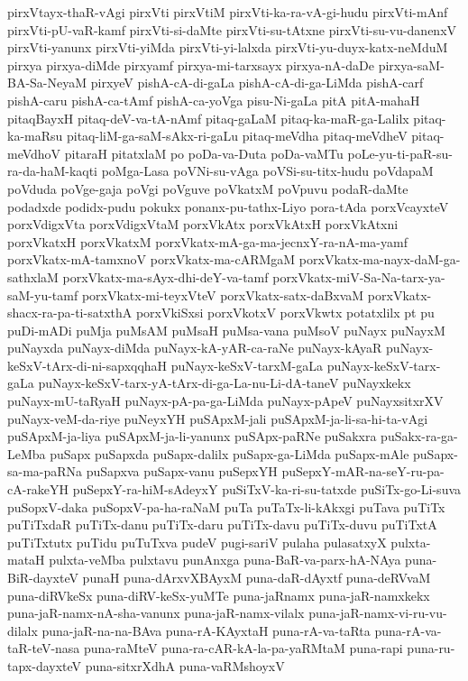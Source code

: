 {pirxVtayx-thaR-vAgi
pirxVti
pirxVtiM
pirxVti-ka-ra-vA-gi-hudu
pirxVti-mAnf
pirxVti-pU-vaR-kamf
pirxVti-si-daMte
pirxVti-su-tAtxne
pirxVti-su-vu-danenxV
pirxVti-yanunx
pirxVti-yiMda
pirxVti-yi-lalxda
pirxVti-yu-duyx-katx-neMduM
pirxya
pirxya-diMde
pirxyamf
pirxya-mi-tarxsayx
pirxya-nA-daDe
pirxya-saM-BA-Sa-NeyaM
pirxyeV
pishA-cA-di-gaLa
pishA-cA-di-ga-LiMda
pishA-carf
pishA-caru
pishA-ca-tAmf
pishA-ca-yoVga
pisu-Ni-gaLa
pitA
pitA-mahaH
pitaqBayxH
pitaq-deV-va-tA-nAmf
pitaq-gaLaM
pitaq-ka-maR-ga-Lalilx
pitaq-ka-maRsu
pitaq-liM-ga-saM-sAkx-ri-gaLu
pitaq-meVdha
pitaq-meVdheV
pitaq-meVdhoV
pitaraH
pitatxlaM
po
poDa-va-Duta
poDa-vaMTu
poLe-yu-ti-paR-su-ra-da-haM-kaqti
poMga-Lasa
poVNi-su-vAga
poVSi-su-titx-hudu
poVdapaM
poVduda
poVge-gaja
poVgi
poVguve
poVkatxM
poVpuvu
podaR-daMte
podadxde
podidx-pudu
pokukx
ponanx-pu-tathx-Liyo
pora-tAda
porxVcayxteV
porxVdigxVta
porxVdigxVtaM
porxVkAtx
porxVkAtxH
porxVkAtxni
porxVkatxH
porxVkatxM
porxVkatx-mA-ga-ma-jecnxY-ra-nA-ma-yamf
porxVkatx-mA-tamxnoV
porxVkatx-ma-cARMgaM
porxVkatx-ma-nayx-daM-ga-sathxlaM
porxVkatx-ma-sAyx-dhi-deY-va-tamf
porxVkatx-miV-Sa-Na-tarx-ya-saM-yu-tamf
porxVkatx-mi-teyxVteV
porxVkatx-satx-daBxvaM
porxVkatx-shacx-ra-pa-ti-satxthA
porxVkiSxsi
porxVkotxV
porxVkwtx
potatxlilx
pt
pu
puDi-mADi
puMja
puMsAM
puMsaH
puMsa-vana
puMsoV
puNayx
puNayxM
puNayxda
puNayx-diMda
puNayx-kA-yAR-ca-raNe
puNayx-kAyaR
puNayx-keSxV-tArx-di-ni-sapxqqhaH
puNayx-keSxV-tarxM-gaLa
puNayx-keSxV-tarx-gaLa
puNayx-keSxV-tarx-yA-tArx-di-ga-La-nu-Li-dA-taneV
puNayxkekx
puNayx-mU-taRyaH
puNayx-pA-pa-ga-LiMda
puNayx-pApeV
puNayxsitxrXV
puNayx-veM-da-riye
puNeyxYH
puSApxM-jali
puSApxM-ja-li-sa-hi-ta-vAgi
puSApxM-ja-liya
puSApxM-ja-li-yanunx
puSApx-paRNe
puSakxra
puSakx-ra-ga-LeMba
puSapx
puSapxda
puSapx-dalilx
puSapx-ga-LiMda
puSapx-mAle
puSapx-sa-ma-paRNa
puSapxva
puSapx-vanu
puSepxYH
puSepxY-mAR-na-seY-ru-pa-cA-rakeYH
puSepxY-ra-hiM-sAdeyxY
puSiTxV-ka-ri-su-tatxde
puSiTx-go-Li-suva
puSopxV-daka
puSopxV-pa-ha-raNaM
puTa
puTaTx-li-kAkxgi
puTava
puTiTx
puTiTxdaR
puTiTx-danu
puTiTx-daru
puTiTx-davu
puTiTx-duvu
puTiTxtA
puTiTxtutx
puTidu
puTuTxva
pudeV
pugi-sariV
pulaha
pulasatxyX
pulxta-mataH
pulxta-veMba
pulxtavu
punAnxga
puna-BaR-va-parx-hA-NAya
puna-BiR-dayxteV
punaH
puna-dArxvXBAyxM
puna-daR-dAyxtf
puna-deRVvaM
puna-diRVkeSx
puna-diRV-keSx-yuMTe
puna-jaRnamx
puna-jaR-namxkekx
puna-jaR-namx-nA-sha-vanunx
puna-jaR-namx-vilalx
puna-jaR-namx-vi-ru-vu-dilalx
puna-jaR-na-na-BAva
puna-rA-KAyxtaH
puna-rA-va-taRta
puna-rA-va-taR-teV-nasa
puna-raMteV
puna-ra-cAR-kA-la-pa-yaRMtaM
puna-rapi
puna-ru-tapx-dayxteV
puna-sitxrXdhA
puna-vaRMshoyxV
}
